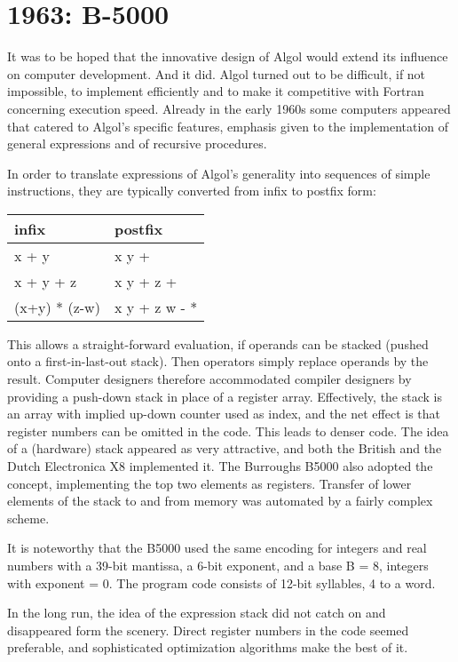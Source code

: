 \section{1963: B-5000}
\label{sec:B5K}
It was to be hoped that the innovative design of Algol would extend its influence on
computer development. And it did. Algol turned out to be difficult, if not impossible,
to implement efficiently and to make it competitive with Fortran concerning
execution speed. Already in the early 1960s some computers appeared that
catered to Algol's specific features, emphasis given to the implementation of
general expressions and of recursive procedures.

In order to translate expressions of Algol's generality into sequences of simple
instructions, they are typically converted from infix to postfix form:
\begin{table}[h!]
  \centering
  \begin{tabular}{l l}\\
    infix         & postfix \\\hline
    x + y         & x y + \\
    x + y + z     & x y + z + \\
    (x+y) * (z-w) & x y + z w - *
  \end{tabular}
\end{table}

This allows a straight-forward evaluation, if operands can be stacked (pushed onto
a first-in-last-out stack). Then operators simply replace operands by the result.
Computer designers therefore accommodated compiler designers by providing a
push-down stack in place of a register array. Effectively, the stack is an array with
implied up-down counter used as index, and the net effect is that register numbers
can be omitted in the code. This leads to denser code.
The idea of a (hardware) stack appeared as very attractive, and both the British
and the Dutch Electronica X8 implemented it. The Burroughs B5000 also
adopted the concept, implementing the top two elements as registers. Transfer of
lower elements of the stack to and from memory was automated by a fairly
complex scheme.

It is noteworthy that the B5000 used the same encoding for integers and real
numbers with a 39-bit mantissa, a 6-bit exponent, and a base B = 8, integers with
exponent = 0. The program code consists of 12-bit syllables, 4 to a word.

In the long run, the idea of the expression stack did not catch on and disappeared
form the scenery. Direct register numbers in the code seemed preferable, and
sophisticated optimization algorithms make the best of it.

